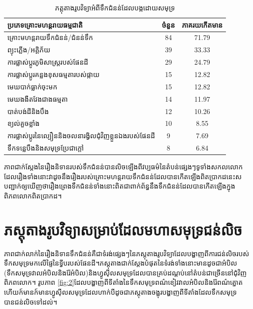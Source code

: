 \documentclass[10pt,twocolumn,letterpaper]{article}
\begin{document}
\begin{table}[ht]
\begin{center}
\renewcommand{\arraystretch}{1.2}  %
\begin{tabular}{|l|c|c|}
\hline
\textbf{ប្រភេទគ្រោះមហន្តរាយធម្មជាតិ} & \textbf{ចំនួន} & \textbf{ភាគរយកើតមាន} \\
\hline\hline
គ្រោះមហន្តរាយទឹកជំនន់/ជំនន់ទឹក            & 84  & 71.79 \\
ព្យុះភ្លើង/អគ្គិភ័យ   & 39 & 33.33 \\
ការផ្លាស់ប្ដូរភូមិសាស្ត្ររបស់ផែនដី   & 29 & 24.79 \\
ការផ្លាស់ប្តូរគន្លងខុសធម្មតារបស់ផ្កាយ     & 15 & 12.82 \\
មេឃបាក់ធ្លាក់ចុះមក           & 15 & 12.82 \\
មេឃងងឺតវែងជាងធម្មតា      & 14 & 11.97 \\
បាត់បង់ដី​និង​បឹង    & 12 & 10.26 \\
ខ្យល់គួចខ្លាំង          & 10 & 8.55  \\
ការផ្លាស់ប្តូរនៃល្បឿននិងចលនារង្វិលជុំវិញខ្លួនឯងរបស់ផែនដី & 9 & 7.69  \\
ទឹកទន្លេ​បឹង​និង​សមុទ្រប្រែជាក្តៅ & 8 & 6.84 \\
\hline
\end{tabular}
\end{center}
\caption{ភត្តុតាងរូបវិទ្យាអំពីទឹកជំនន់ដែលបង្កដោយសមុទ្រ}
\label{tab: 1}
\end{table}

ភាពជាក់ស្តែងនៃរឿងនិទានរបស់ទឹកជំនន់បានលិចឡើងពីវប្បធម៌នៃតំបន់ផ្សេងៗទូទាំងសកលលោក​ដែលរឿងទាំងនោះវាដូចនឹងរឿងរបស់គ្រោះមហន្តរាយទឹកជំនន់ដែលបានកើតឡើងពិតប្រាកដ​នេះសបញ្ជាក់ឲ្យឃើញថារឿងព្រេងទឹកជំនន់ទាំងនោះពិតជាពាក់ព័ន្ធនឹងទឹកជំនន់ដែលបានកើតឡើងក្នុងពិភពលោកពិតប្រាកដ។

\section{ភស្តុតាងរូបវិទ្យាសម្រាប់ដែលមហាសមុទ្រជន់លិច}

ភាពជាក់លាក់នៃរឿងនិទានទឹកជំនន់គឺជាទំរង់ផ្សេងៗនៃភស្តុតាងរូបវិទ្យាដែលបង្ហាញពីការជន់លិចរបស់ទឹកសមុទ្រមកលើផ្ទៃនៃទ្វីបរបស់ផែនដី។ភស្តុតាងជាក់ស្តែងបំផុតនៃទំរង់ទាំងនោះមានដូចជាអំបិល​(ទឹកសមុទ្រ​វាលអំបិល​និងរ៉ែអំបិល)​និង​ហ្វូស៊ីលសមុទ្រដែលបានគ្រប់ដណ្តប់នៅតំបន់ជាច្រើននៅជុំវិញពិភពលោក។ រូបភាព \ref{fig:2} ​ដែលបង្ហាញពីទីតាំងនៃទឹកសមុទ្រពណ៌ខៀវ​វាលអំបិលនិងរ៉ែពណ៌ត្នោត​ហើយក៍មានក៍មានហ្វូស៊ីលសមុទ្រ​\cite{15,16,86,87} ដែលហាក់បីដូចជាភស្តុតាងចង្អុរបង្ហាញពីទីតាំងដែលទឹកសមុទ្របានជន់លិចទៅដល់។
\end{document}
